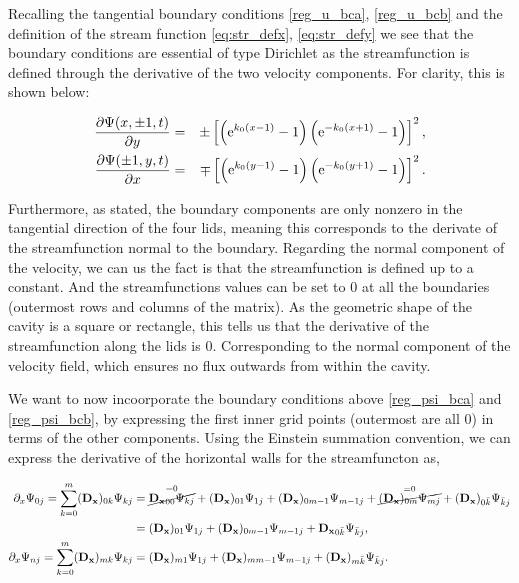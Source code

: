 Recalling the tangential boundary conditions \eqref{reg_u_bca},
\eqref{reg_u_bcb} and the definition of the stream function
\eqref{eq:str_defx}, \eqref{eq:str_defy} we see that the boundary conditions
are essential of type Dirichlet as the streamfunction is defined through the
derivative of the two velocity components. For clarity, this is shown below:

\begin{eqnarray}
\frac{\partial\Psi(x,\pm 1,t)}{\partial y} & = & \pm\left[\left(\mathrm{e}^{k_0(x - 1)} - 1\right)
  \left(\mathrm{e}^{-k_0(x + 1)} - 1\right)\right]^2,\label{reg_psi_bca} \\
  \frac{\partial\Psi(\pm 1,y,t)}{\partial x} & = & \mp\left[\left(\mathrm{e}^{k_0(y - 1)} - 1\right)
  \left(\mathrm{e}^{-k_0(y + 1)} - 1\right)\right]^2.\label{reg_psi_bcb}
\end{eqnarray}

Furthermore, as stated, the boundary components are only nonzero in the
tangential direction of the four lids, meaning this corresponds to the derivate
of the streamfunction normal to the boundary. Regarding the normal component of
the velocity, we can us the fact is that the streamfunction is defined up to a
constant. And the streamfunctions values can be set to $0$ at all the
boundaries (outermost rows and columns of the matrix). As the geometric shape
of the cavity is a square or rectangle, this tells us that the derivative of
the streamfunction along the lids is $0$. Corresponding to the normal component
of the velocity field, which ensures no flux outwards from within the cavity.

We want to now incoorporate the boundary conditions above \eqref{reg_psi_bca}
and \eqref{reg_psi_bcb}, by expressing the first inner grid points (outermost
are all $0$) in terms of the other components. Using the Einstein summation
convention, we can express the derivative of the horizontal walls for the
streamfuncton as,

\begin{align}
\partial_x \Psi_{0j} = \sum_{k=0}^{m} (\mathbf{D_x})_{0k} \Psi_{kj}
  &= \overset{=0}{\cancel{\mathbf{D_x}_{00}\Psi_{kj}}} + (\mathbf{D_x})_{01}\Psi_{1j} 
  + (\mathbf{D_x})_{0m-1}\Psi_{m-1j} +  \overset{=0}{\cancel{(\mathbf{D_x})_{0m}\Psi_{mj}}}
  + (\mathbf{D_x})_{0\bar{k}}\Psi_{\bar{k}j} \nonumber \\
  &= (\mathbf{D_x})_{01}\Psi_{1j} + (\mathbf{D_x})_{0m-1}\Psi_{m-1j}
  + \mathbf{D_x}_{0\bar{k}}\Psi_{\bar{k}j}, \\
\partial_x \Psi_{nj} = \sum_{k=0}^{m} (\mathbf{D_x})_{mk} \Psi_{kj}
  &= (\mathbf{D_x})_{m1}\Psi_{1j} + (\mathbf{D_x})_{mm-1}\Psi_{m-1j} 
  + (\mathbf{D_x})_{m\bar{k}}\Psi_{\bar{k}j}.
\end{align}

